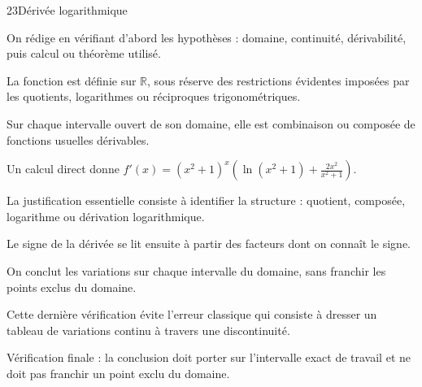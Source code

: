 \documentclass[11pt,a4paper]{article}
\newcommand{\R}{\mathbb{R}}
\begin{document}
\begin{corrbox}{23}{Dérivée logarithmique}

\begin{methodebox}
On rédige en vérifiant d'abord les hypothèses : domaine, continuité, dérivabilité, puis calcul ou théorème utilisé.
\end{methodebox}

La fonction est définie sur $\R$, sous réserve des restrictions évidentes imposées par les quotients, logarithmes ou réciproques trigonométriques.


Sur chaque intervalle ouvert de son domaine, elle est combinaison ou composée de fonctions usuelles dérivables.


Un calcul direct donne $f'(x)=(x^2+1)^x\left(\ln(x^2+1)+\frac{2x^2}{x^2+1}\right)$.


La justification essentielle consiste à identifier la structure : quotient, composée, logarithme ou dérivation logarithmique.


Le signe de la dérivée se lit ensuite à partir des facteurs dont on connaît le signe.


On conclut les variations sur chaque intervalle du domaine, sans franchir les points exclus du domaine.


Cette dernière vérification évite l'erreur classique qui consiste à dresser un tableau de variations continu à travers une discontinuité.


\begin{attentionbox}
Vérification finale : la conclusion doit porter sur l'intervalle exact de travail et ne doit pas franchir un point exclu du domaine.
\end{attentionbox}

\end{corrbox}
\end{document}
